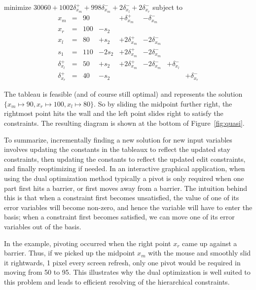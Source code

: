 \documentclass{article}
\begin{document}
\begin{trivlist}\item
minimize $30060 + 1002 \delta_{x_m}^+ + 998 \delta_{x_m}^-  + 2
\delta_{x_l}^- + 2\delta_{x_r}^- $ 
subject to 
$$
\begin{array}{rlrrrrrr} 
x_m & = &90 & & + \delta_{x_m}^+ & - \delta_{x_m}^- \\
x_r & = &100 & - s_2 \\ \hline
x_l & = & 80 & + s_2 & + 2 \delta_{x_m}^+ & - 2 \delta_{x_m}^- \\
s_1 & = &110 & - 2 s_2 & + 2 \delta_{x_m}^+ & - 2\delta_{x_m}^- \\
\delta_{x_l}^+ & = & 50 & + s_2 & + 2 \delta_{x_m}^+ & - 2\delta_{x_m}^- &
                + \delta_{x_l}^- \\
\delta_{x_r}^+ & = & 40 & - s_2 &&&&  +\delta_{x_r}^-
\end{array}
$$
\end{trivlist}
The tableau is feasible (and of course still
optimal) and represents the solution
$\{x_m \mapsto 90, x_r \mapsto 100, x_l \mapsto 80\}$.
So by sliding the midpoint further right, the rightmost point hits the wall
and the left point slides right to satisfy the constraints.
The resulting diagram is shown at the bottom of Figure~\ref{fig:quasi}.

To summarize, incrementally finding a new solution for new input variables
involves updating the constants in the tableaux to reflect the updated stay
constraints, then updating the constants to reflect the updated edit
constraints, and finally reoptimizing if needed.  In an interactive
graphical application, when using the dual optimization method typically a
pivot is only required when one part first hits a barrier, or first moves
away from a barrier.  The intuition behind this is that
when a constraint
first becomes unsatisfied, the value of one of its error variables will
become non-zero, and hence the variable will have to enter the basis;
when a constraint first becomes satisfied,
we can move one of its error variables out of the basis.

In the example, pivoting occurred when the right point $x_r$ came up against a
barrier.  Thus, if we picked up the midpoint $x_m$ with the mouse and
smoothly slid it rightwards, 1 pixel every screen refresh, only one pivot
would be required in moving from 50 to 95.  This illustrates why the dual
optimization is well suited to this problem and leads to efficient
resolving of the hierarchical constraints.
\end{document}
